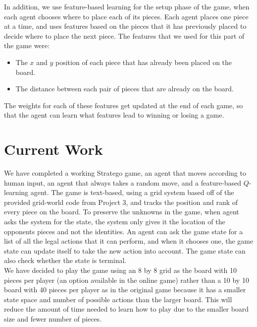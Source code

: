 \documentclass[letterpaper]{article}
\begin{document}
In addition, we use feature-based learning for the setup phase of the game, when each agent chooses where to place each of its pieces. Each agent places one piece at a time, and uses features based on the pieces that it has previously placed to decide where to place the next piece. The features that we used for this part of the game were:
\begin{itemize}
\item The $x$ and $y$ position of each piece that has already been placed on the board.
\item The distance between each pair of pieces that are already on the board.
\end{itemize}

The weights for each of these features get updated at the end of each game, so that the agent can learn what features lead
to winning or losing a game.




\section{Current Work}

We have completed a working Stratego game, an agent that moves according to human input, an agent that always takes a random move, and a feature-based $Q$-learning agent. The game is text-based, using a grid system based off of the provided grid-world code from Project 3, and tracks the position and rank of every piece on the board. To preserve the unknowns in the game, when agent asks the system for the state, the system only gives it the location of the opponents pieces and not the identities. An agent can ask the game state for a list of all the legal actions that it can perform, and when it chooses one, the game state can update itself to take the new action into account. The game state can also check whether the state is terminal.\\

We have decided to play the game using an 8 by 8 grid as the board with 10 pieces per player (an option available in the online game) rather than a 10 by 10 board with 40 pieces per player as in the original game because it has a smaller state space and number of possible actions than the larger board. This will reduce the amount of time needed to learn how to play  due to the smaller board size and fewer number of pieces.\\
\end{document}
